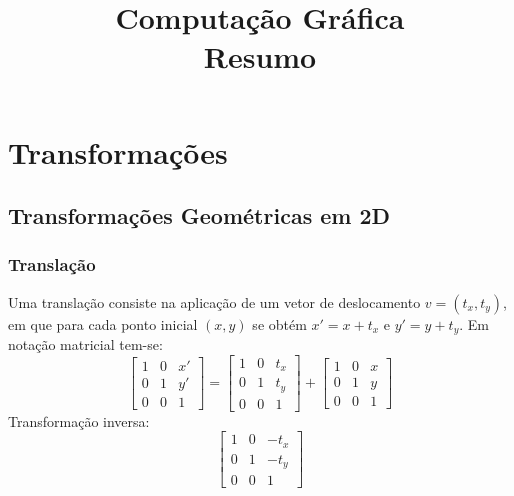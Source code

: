 \documentclass[10pt,a4paper]{report}
\title{\LARGE{Computação Gráfica} \\ \vspace{0.5cm} \normalsize{Resumo}}
\date{}
\begin{document}
\maketitle
\tableofcontents

\chapter{Transformações}

\section{Transformações Geométricas em 2D}

\subsection{Translação}
Uma translação consiste na aplicação de um vetor de deslocamento $v = (t_x, t_y)$, em que para cada ponto inicial $(x,y)$ se obtém $x'= x + t_x$ e $y'=y+t_y$. Em notação matricial tem-se:
$$
\begin{bmatrix}
1& 0& x'\\
0& 1& y'\\
0& 0& 1
\end{bmatrix} = \begin{bmatrix}
1 & 0 & t_x\\
0 & 1 &t_y\\
0 & 0 & 1
\end{bmatrix} + \begin{bmatrix}
1& 0& x\\
0& 1& y\\
0& 0& 1
\end{bmatrix}
$$
Transformação inversa:
$$
\begin{bmatrix}
1 & 0 & -t_x\\
0 & 1 & -t_y\\
0 & 0 & 1
\end{bmatrix}
$$
\end{document}
